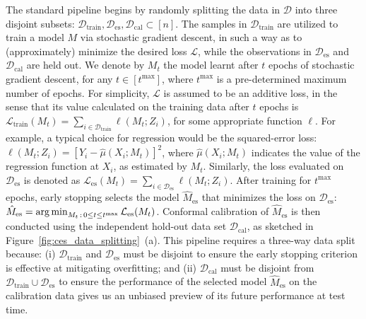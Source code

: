 The standard pipeline begins by randomly splitting the data in $\mathcal{D}$ into three disjoint subsets: $\mathcal{D}_{\text{train}}, \mathcal{D}_{\text{es}}, \mathcal{D}_{\text{cal}} \subset [n]$.
The samples in $\mathcal{D}_{\text{train}}$ are utilized to train a model $M$ via stochastic gradient descent, in such a way as to (approximately) minimize the desired loss $\mathcal{L}$, while the observations in $\mathcal{D}_{\text{es}}$ and $\mathcal{D}_{\text{cal}}$ are held out.
We denote by $M_t$ the model learnt after $t$ epochs of stochastic gradient descent, for any $t \in [t^{\text{max}}]$, where $t^{\text{max}}$ is a pre-determined maximum number of epochs. For simplicity, $\mathcal{L}$ is assumed to be an additive loss, in the sense that its value calculated on the training data after $t$ epochs is
$\mathcal{L}_{\text{train}}(M_t) = \sum_{i \in \mathcal{D}_{\text{train}}} \ell(M_t; Z_i)$,
for some appropriate function $\ell$. For example, a typical choice for regression would be the squared-error loss: $\ell(M_t; Z_i) = \left[Y_i - \hat{\mu}(X_i; M_t) \right]^2$, where $\hat{\mu}(X_i; M_t)$ indicates the value of the regression function at $X_i$, as estimated by $M_t$.
Similarly, the loss evaluated on $\mathcal{D}_{\text{es}}$ is denoted as $\mathcal{L}_{\text{es}}(M_t) = \sum_{i \in \mathcal{D}_{\text{es}}} \ell(M_t; Z_i)$.
After training for $t^{\text{max}}$ epochs, early stopping selects the model $\hat{M}_{\text{es}}$ that minimizes the loss on $\mathcal{D}_{\text{es}}$:
$\hat{M}_{\text{es}} = \operatorname*{arg\,min}_{M_t \, : \, 0 \leq t \leq t^{\text{max}}} \mathcal{L}_{\text{es}}(M_t)$.
Conformal calibration of $\hat{M}_{\text{es}}$ is then conducted using the independent hold-out data set $\mathcal{D}_{\text{cal}}$, as sketched in Figure~\ref{fig:ces_data_splitting}~(a).
This pipeline requires a three-way data split because: (i) $\mathcal{D}_{\text{train}}$ and $\mathcal{D}_{\text{es}}$ must be disjoint to ensure the early stopping criterion is effective at mitigating overfitting; and (ii) $\mathcal{D}_{\text{cal}}$ must be disjoint from $\mathcal{D}_{\text{train}} \cup \mathcal{D}_{\text{es}}$ to ensure the performance of the selected model $\hat{M}_{\text{es}}$ on the calibration data gives us an unbiased preview of its future performance at test time.

\begin{figure*}[!htb]
  \centering
  ~~~~~
  \caption{Schematic visualization of rigorous conformal inferences for models trained with early stopping. (a) Conventional pipeline requiring a three-way sample split. (b) Conformalized early stopping, requiring only a two-way split.}
  \label{fig:ces_data_splitting}
\end{figure*}

